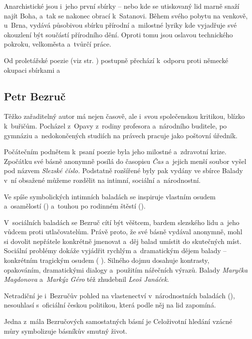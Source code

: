Anarchistické jsou i~jeho první sbírky --    nebo  kde se utiskovaný lid
marně snaží najít Boha, a~tak se nakonec obrací k~Satanovi. Během svého
pobytu na venkově, u~Brna, vydává působivou sbírku přírodní a~milostné
lyriky  kde vyjadřuje své okouzlení být
součástí přírodního dění. Oproti tomu  jsou oslavou
technického pokroku, velkoměsta a~tvůrčí práce.

Od proletářské poezie (viz str. \pageref{chap:SKNagit}) postupně přechází k~odporu proti německé okupaci
sbírkami   
 a~

\subsection*{Petr Bezruč}
Těžko zařaditelný autor  má nejen časově, ale i~svou
společenskou kritikou, blízko k~buřičům. Pocházel z~Opavy z~rodiny
profesora a~národního buditele, po gymnáziu a~nedokončených studiích na
právech pracuje jako poštovní úředník.

Počátečním podnětem k~psaní poezie byla jeho milostné a~zdravotní krize.
Zpočátku své básně anonymně posílá do časopisu \emph{Čas} a~jejich menší
soubor vyšel pod názvem \emph{Slezské číslo.} Podstatně rozšířené byly
pak vydány ve sbírce  Balady v~ní obsažené můžeme
rozdělit na intimní, sociální a~národnostní.

Ve spíše symbolických intimních baladách se inspiruje vlastním osudem
a~osamělostí () a~touhou po rodinném štěstí
().

V~sociálních baladách se Bezruč cítí být věštcem, bardem slezského lidu
a~jeho vůdcem proti utlačovatelům. Právě proto, že své básně vydával
anonymně, mohl si dovolit nepřátele konkrétně jmenovat a~děj balad
umístit do skutečných míst. Sociální problémy dokáže vyjádřit rychlým
a~dramatickým dějem balady -- konkrétním tragickým osudem (   ). Silného dojmu dosahuje kontrasty, opakováním, dramatickými
dialogy a~použitím nářečních výrazů. Balady \emph{Maryčka Magdonova}
a~\emph{Markýz Géro} též zhudebnil \emph{Leoš Janáček}.

Netradiční je i~Bezručův pohled na vlastenectví v~národnostních baladách
(), nesouhlasí s~oficiální českou politikou, která
podle něj na lid zapomíná.

Jedna z~mála Bezručových samostatných básní je 
Celoživotní hledání vzácné můry symbolizuje básníkův smutný život.